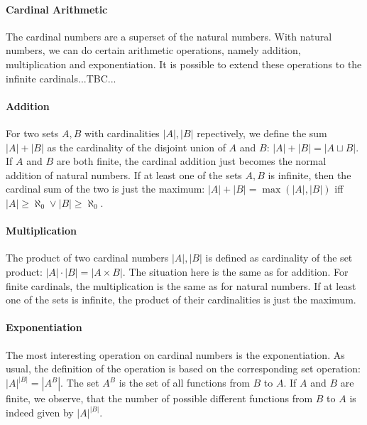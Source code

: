 \paragraph{Cardinal Arithmetic}
The cardinal numbers are a superset of the natural numbers. With natural numbers, we can do certain arithmetic operations, namely addition, multiplication and exponentiation. It is possible to extend these operations to the infinite cardinals...TBC...


\paragraph{Addition} For two sets $A,B$ with cardinalities $|A|,|B|$ repectively, we define the sum $|A| + |B|$ as the cardinality of the disjoint union of $A$ and $B$: $|A| + |B| = |A \sqcup B|$. If $A$ and $B$ are both finite, the cardinal addition just becomes the normal addition of natural numbers. If at least one of the sets $A, B$ is infinite, then the cardinal sum of the two is just the maximum: $|A| + |B| = \max(|A|, |B|)$ iff $|A| \geq \aleph_0 \vee |B| \geq \aleph_0$. 



\paragraph{Multiplication} The product of two cardinal numbers $|A|,|B|$ is defined as cardinality of the set product: $|A| \cdot |B| = |A \times B|$. The situation here is the same as for addition. For finite cardinals, the multiplication is the same as for natural numbers. If at least one of the sets is infinite, the product of their cardinalities is just the maximum.


\paragraph{Exponentiation} The most interesting operation on cardinal numbers is the exponentiation. As usual, the definition of the operation is based on the corresponding set operation: $|A|^{|B|} = |A^B|$. The set $A^B$ is the set of all functions from $B$ to $A$. If $A$ and $B$ are finite, we observe, that the number of possible different functions from $B$ to $A$ is indeed given by $|A|^{|B|}$.

